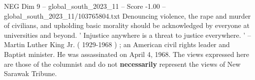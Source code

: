 \begin{textsample}{NEG Dim 9 – global\_south\_2023\_11 – Score -1.00 – global\_south\_2023\_11/103765804.txt}
Denouncing violence, the rape and murder of civilians, and upholding basic morality should be acknowledged by everyone at universities and beyond. ' Injustice anywhere is a threat to justice everywhere. ' -- Martin Luther King Jr. ( 1929-1968 ) ; an American civil rights leader and Baptist minister.
He was assassinated on April 4, 1968.
The views expressed here are those of the columnist and do not \textbf{necessarily} represent the views of New Sarawak Tribune.

\end{textsample}
